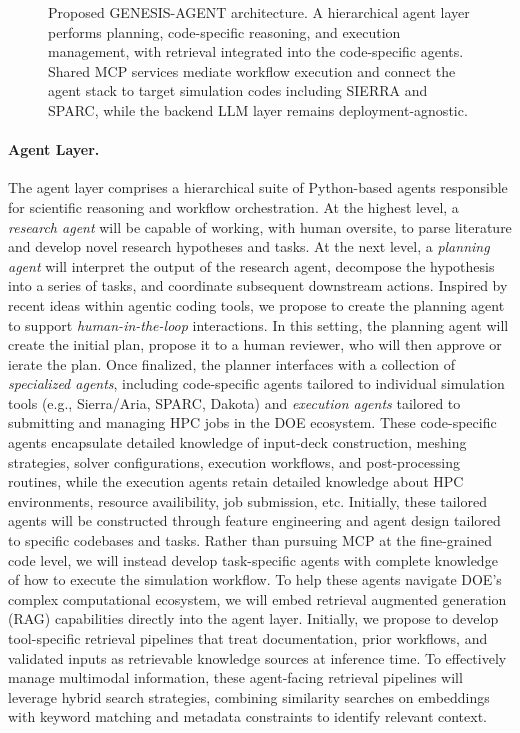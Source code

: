 \documentclass[11pt]{article} \usepackage[margin=1in]{geometry}
\begin{document}
\begin{figure}[t]
\caption{Proposed GENESIS-AGENT architecture. A hierarchical agent layer performs planning, code-specific reasoning, and execution management, with retrieval integrated into the code-specific agents. Shared MCP services mediate workflow execution and connect the agent stack to target simulation codes including SIERRA and SPARC, while the backend LLM layer remains deployment-agnostic.}
\label{fig:genesis-architecture}
\end{figure}


\paragraph{Agent Layer.} The agent layer comprises a hierarchical suite of
Python-based agents responsible for scientific reasoning and workflow
orchestration. At the highest level, a \textit{research agent} will be capable of
working, with human oversite, to parse literature and develop novel research
hypotheses and tasks. At the next level, a \textit{planning agent} will
interpret the output of the research agent, decompose the hypothesis into a
series of tasks, and coordinate subsequent downstream actions. Inspired by
recent ideas within agentic coding tools, we propose to create the planning
agent to support \textit{human-in-the-loop} interactions. In this setting, the planning agent
will create the initial plan, propose it to a human reviewer, who will then
approve or ierate the plan. Once finalized, the planner interfaces with a collection of \emph{specialized agents},
including code-specific agents tailored to individual simulation tools (e.g.,
Sierra/Aria, SPARC, Dakota) and \textit{execution agents} tailored to submitting
and managing HPC jobs in the DOE ecosystem. These code-specific agents encapsulate detailed
knowledge of input-deck construction, meshing strategies, solver configurations,
execution workflows, and post-processing routines, while the execution agents
retain detailed knowledge about HPC environments, resource availibility, job
submission, etc. Initially, these tailored agents will be constructed through feature engineering
and agent design tailored to specific codebases and tasks. Rather than pursuing MCP at the fine-grained code level, we will
instead develop task-specific agents with complete knowledge of how to execute
the simulation workflow. To help these agents navigate DOE's complex
computational ecosystem, we will embed retrieval augmented generation (RAG)
capabilities directly into the agent layer. Initially, we propose to develop
tool-specific retrieval pipelines that treat documentation, prior workflows,
and validated inputs as retrievable knowledge sources at inference time. To
effectively manage multimodal information, these agent-facing retrieval
pipelines will leverage hybrid search strategies, combining similarity searches
on embeddings with keyword matching and metadata constraints to identify
relevant context.
 
\end{document}
